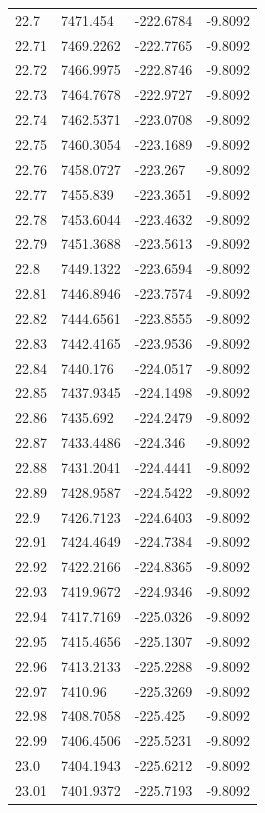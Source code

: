 \begin{table}[H]
\begin{tabular}{llll}
22.7 & 7471.454 & -222.6784 & -9.8092 \\
22.71 & 7469.2262 & -222.7765 & -9.8092 \\
22.72 & 7466.9975 & -222.8746 & -9.8092 \\
22.73 & 7464.7678 & -222.9727 & -9.8092 \\
22.74 & 7462.5371 & -223.0708 & -9.8092 \\
22.75 & 7460.3054 & -223.1689 & -9.8092 \\
22.76 & 7458.0727 & -223.267 & -9.8092 \\
22.77 & 7455.839 & -223.3651 & -9.8092 \\
22.78 & 7453.6044 & -223.4632 & -9.8092 \\
22.79 & 7451.3688 & -223.5613 & -9.8092 \\
22.8 & 7449.1322 & -223.6594 & -9.8092 \\
22.81 & 7446.8946 & -223.7574 & -9.8092 \\
22.82 & 7444.6561 & -223.8555 & -9.8092 \\
22.83 & 7442.4165 & -223.9536 & -9.8092 \\
22.84 & 7440.176 & -224.0517 & -9.8092 \\
22.85 & 7437.9345 & -224.1498 & -9.8092 \\
22.86 & 7435.692 & -224.2479 & -9.8092 \\
22.87 & 7433.4486 & -224.346 & -9.8092 \\
22.88 & 7431.2041 & -224.4441 & -9.8092 \\
22.89 & 7428.9587 & -224.5422 & -9.8092 \\
22.9 & 7426.7123 & -224.6403 & -9.8092 \\
22.91 & 7424.4649 & -224.7384 & -9.8092 \\
22.92 & 7422.2166 & -224.8365 & -9.8092 \\
22.93 & 7419.9672 & -224.9346 & -9.8092 \\
22.94 & 7417.7169 & -225.0326 & -9.8092 \\
22.95 & 7415.4656 & -225.1307 & -9.8092 \\
22.96 & 7413.2133 & -225.2288 & -9.8092 \\
22.97 & 7410.96 & -225.3269 & -9.8092 \\
22.98 & 7408.7058 & -225.425 & -9.8092 \\
22.99 & 7406.4506 & -225.5231 & -9.8092 \\
23.0 & 7404.1943 & -225.6212 & -9.8092 \\
23.01 & 7401.9372 & -225.7193 & -9.8092 \\

\end{tabular}
\end{table}
